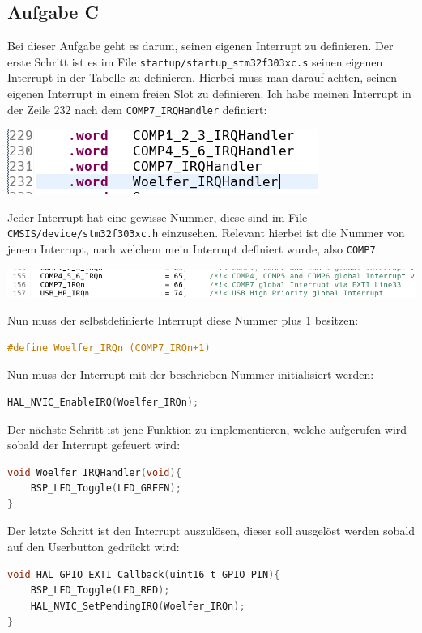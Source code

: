 \clearpage
\subsection{Aufgabe C}
Bei dieser Aufgabe geht es darum, seinen eigenen Interrupt zu definieren. Der erste Schritt ist es im File \verb|startup/startup_stm32f303xc.s| seinen eigenen Interrupt in der Tabelle zu definieren. Hierbei muss man darauf achten, seinen eigenen Interrupt in einem freien Slot zu definieren. Ich habe meinen Interrupt in der Zeile 232 nach dem \verb|COMP7_IRQHandler| definiert:

\begin{minipage}{\linewidth}
	\centering
	\includegraphics[width=0.8\linewidth]{images/1}
\end{minipage}

Jeder Interrupt hat eine gewisse Nummer, diese sind im File \verb|CMSIS/device/stm32f303xc.h| einzusehen. Relevant hierbei ist die Nummer von jenem Interrupt, nach welchem mein Interrupt definiert wurde, also \verb|COMP7|:

\begin{minipage}{\linewidth}
	\centering
	\includegraphics[width=0.8\linewidth]{images/2}
\end{minipage}

Nun muss der selbstdefinierte Interrupt diese Nummer plus 1 besitzen:

\begin{lstlisting}[language=C]
#define Woelfer_IRQn (COMP7_IRQn+1)
\end{lstlisting}

Nun muss der Interrupt mit der beschrieben Nummer initialisiert werden:

\begin{lstlisting}[language=C]
HAL_NVIC_EnableIRQ(Woelfer_IRQn);
\end{lstlisting}

Der nächste Schritt ist jene Funktion zu implementieren, welche aufgerufen wird sobald der Interrupt gefeuert wird:

\begin{lstlisting}[language=C]
void Woelfer_IRQHandler(void){
	BSP_LED_Toggle(LED_GREEN);
}
\end{lstlisting}

Der letzte Schritt ist den Interrupt auszulösen, dieser soll ausgelöst werden sobald auf den Userbutton gedrückt wird:

\begin{lstlisting}[language=C]
void HAL_GPIO_EXTI_Callback(uint16_t GPIO_PIN){
	BSP_LED_Toggle(LED_RED);
	HAL_NVIC_SetPendingIRQ(Woelfer_IRQn);
}
\end{lstlisting}
